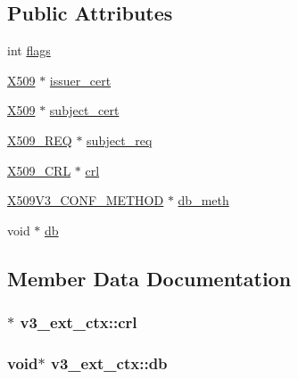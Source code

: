 \subsection*{Public Attributes}
\begin{DoxyCompactItemize}
\item 
int \hyperlink{structv3__ext__ctx_aef13996482523a866443b3160db73291}{flags}
\item 
\hyperlink{ossl__typ_8h_a4f666bde6518f95deb3050c54b408416}{X509} $\ast$ \hyperlink{structv3__ext__ctx_a727f0302b59312053fdcbd09a195cf85}{issuer\+\_\+cert}
\item 
\hyperlink{ossl__typ_8h_a4f666bde6518f95deb3050c54b408416}{X509} $\ast$ \hyperlink{structv3__ext__ctx_ab93937a6f72e09c41303ebe54c6aa6be}{subject\+\_\+cert}
\item 
\hyperlink{x509_8h_afcb1c737fc5aee6c012c238794ef2d66}{X509\+\_\+\+R\+EQ} $\ast$ \hyperlink{structv3__ext__ctx_a2c538c77545078ac3834d7ec19baa2e1}{subject\+\_\+req}
\item 
\hyperlink{ossl__typ_8h_ac8661d2485c2c8da5fd7dd26b846f4bf}{X509\+\_\+\+C\+RL} $\ast$ \hyperlink{structv3__ext__ctx_a01c6e9a776b48effe171dccb3f5ba653}{crl}
\item 
\hyperlink{x509v3_8h_aa95cb7d1c2231f28f49bc9e7ba63e5a0}{X509\+V3\+\_\+\+C\+O\+N\+F\+\_\+\+M\+E\+T\+H\+OD} $\ast$ \hyperlink{structv3__ext__ctx_a7e8b728812e1ae2216de8991faeae558}{db\+\_\+meth}
\item 
void $\ast$ \hyperlink{structv3__ext__ctx_ab9c02945f7b4566735f6184baf63b765}{db}
\end{DoxyCompactItemize}


\subsection{Member Data Documentation}
\subsubsection[{\texorpdfstring{crl}{crl}}]{$\ast$ v3\+\_\+ext\+\_\+ctx\+::crl}\hypertarget{structv3__ext__ctx_a01c6e9a776b48effe171dccb3f5ba653}{}\label{structv3__ext__ctx_a01c6e9a776b48effe171dccb3f5ba653}
\subsubsection[{\texorpdfstring{db}{db}}]{\setlength{\rightskip}{0pt plus 5cm}void$\ast$ v3\+\_\+ext\+\_\+ctx\+::db}\hypertarget{structv3__ext__ctx_ab9c02945f7b4566735f6184baf63b765}{}\label{structv3__ext__ctx_ab9c02945f7b4566735f6184baf63b765}

